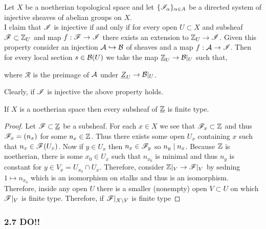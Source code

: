 \documentclass[12pt]{article}
\begin{document}
Let $X$ be a noetherian topological space and let $\{ \mathscr{I}_\alpha \}_{\alpha \in A}$ be a directed system of injective sheaves of abelian groups on $X$. 
\bigskip\\
I claim that $\mathscr{I}$ is injective if and only if for every open $U \subset X$ and subsheaf $\mathscr{F} \subset \mathbb{Z}_U$ and map $f : \mathscr{F} \to \mathscr{I}$ there exists an extension to $\mathbb{Z}_U \to \mathscr{I}$. Given this property consider an injection $\mathcal{A} \hookrightarrow \mathcal{B}$ of sheaves and a map $f : \mathcal{A} \to \mathscr{I}$. Then for every local section $s \in \mathcal{B}(U)$ we take the map $\underline{\mathbb{Z}}_U \to \mathcal{B}|_U$ such that,
\begin{center}
\end{center}
where $\mathcal{R}$ is the preimage of $\mathcal{A}$ under $\underline{Z}_U \to \mathcal{B}|_U$. 


Clearly, if $\mathscr{I}$ is injective the above property holds.

\begin{lemma}
If $X$ is a noetherian space then every subsheaf of $\underline{\mathbb{Z}}$ is finite type.
\end{lemma}

\begin{proof}
Let $\mathscr{F} \subset \underline{\mathbb{Z}}$ be a subsheaf. For each $x \in X$ we see that $\mathscr{F}_x \subset \mathbb{Z}$ and thus $\mathscr{F}_x = (n_x)$ for some $n_x \in \mathbb{Z}$. Thus there exists some open $U_x$ containing $x$ such that $n_x \in \mathscr{F}(U_x)$. Now if $y \in U_x$ then $n_x \in \mathscr{F}_y$ so $n_y \mid n_x$. Because $\mathbb{Z}$ is noetherian, there is some $x_0 \in U_x$ such that $n_{x_0}$ is minimal and thus $n_y$ is constant for $y \in V_{x} = U_{x_0} \cap U_x$. Therefore, consider $\mathbb{Z}|_V \to \mathscr{F}|_V$ by sedning $1 \mapsto n_{x_0}$ which is an isomorphism on stalks and thus is an isomorphism. Therefore, inside any open $U$ there is a smaller (nonempty) open $V \subset U$ on which $\mathscr{F}|_V$ is finite type. Therefore, if $\mathscr{F}|_{X \setminus V}$ is finite type 
\end{proof}

\subsubsection{2.7 DO!!}
\end{document}
